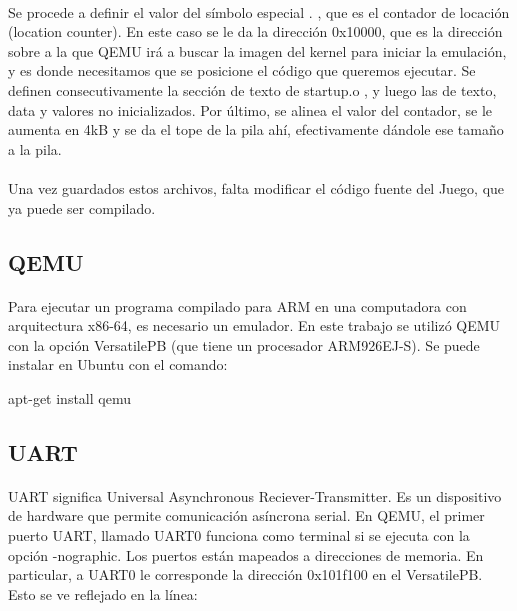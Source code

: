 \documentclass{article}
\begin{document}
\paragraph{}
Se procede a definir el valor del s\'imbolo especial . , que es el contador de locaci\'on (location counter). En este caso se le da la direcci\'on 0x10000, que es la direcci\'on sobre a la que QEMU ir\'a a buscar la imagen del kernel para iniciar la emulaci\'on, y es donde necesitamos que se posicione el c\'odigo que queremos ejecutar.\cite{BalauBareMetal3} Se definen consecutivamente la secci\'on de texto de startup.o , y luego las de texto, data y valores no inicializados. Por \'ultimo, se alinea el valor del contador, se le aumenta en 4kB y se da el tope de la pila ah\'i, efectivamente d\'andole ese tama\~no a la pila.

\paragraph{}
Una vez guardados estos archivos, falta modificar el c\'odigo fuente del Juego, que ya puede ser compilado.

\subsection{QEMU}

\paragraph{}
Para ejecutar un programa compilado para ARM en una computadora con arquitectura x86-64, es necesario un emulador. En este trabajo se utiliz\'o QEMU con la opci\'on VersatilePB (que tiene un procesador ARM926EJ-S)\cite{WikiQEMU}\cite{BalauBareMetal2}. Se puede instalar en Ubuntu con el comando:

\begin{commandshell}
apt-get install qemu
\end{commandshell}

\subsection{UART}

\paragraph{}
UART significa Universal Asynchronous Reciever-Transmitter\cite{WikiUART}. Es un dispositivo de hardware que permite comunicaci\'on as\'incrona serial. En QEMU, el primer puerto UART, llamado UART0 funciona como terminal si se ejecuta con la opci\'on -nographic.\cite{BalauBareMetal3} Los puertos est\'an mapeados a direcciones de memoria. En particular, a UART0 le corresponde la direcci\'on 0x101f100 en el VersatilePB. Esto se ve reflejado en la l\'inea:
\end{document}
